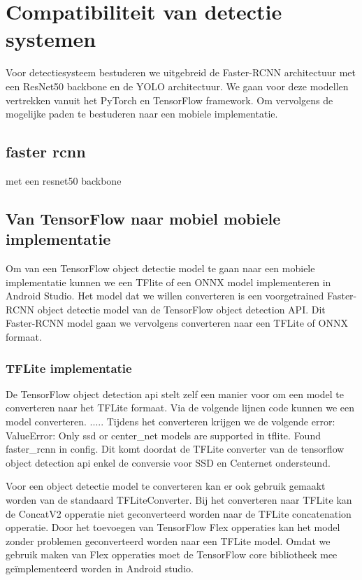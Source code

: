 \chapter{Compatibiliteit van detectie systemen}
Voor detectiesysteem bestuderen we uitgebreid de Faster-RCNN architectuur met een ResNet50 backbone en de YOLO architectuur.
We gaan voor deze modellen vertrekken vanuit het PyTorch en TensorFlow framework.
Om vervolgens de mogelijke paden te bestuderen naar een mobiele implementatie.

\section{faster rcnn}
met een resnet50 backbone

\section{Van TensorFlow naar mobiel mobiele implementatie}
Om van een TensorFlow object detectie model te gaan naar een mobiele implementatie kunnen we een TFlite of een ONNX model implementeren in Android Studio.
Het model dat we willen converteren is een voorgetrained Faster-RCNN object detectie model van de TensorFlow object detection API.
Dit Faster-RCNN model gaan we vervolgens converteren naar een TFLite of ONNX formaat.

\subsection{TFLite implementatie}

De TensorFlow object detection api stelt zelf een manier voor om een model te converteren naar het TFLite formaat.
Via de volgende lijnen code kunnen we een model converteren.
.....
Tijdens het converteren krijgen we de volgende error: ValueError: Only ssd or center\_net models are supported in tflite. Found faster\_rcnn in config.
Dit komt doordat de TFLite converter van de tensorflow object detection api enkel de conversie voor SSD en Centernet ondersteund.

Voor een object detectie model te converteren kan er ook gebruik gemaakt worden van de standaard TFLiteConverter.
Bij het converteren naar TFLite kan de ConcatV2 opperatie niet geconverteerd worden naar de TFLite concatenation opperatie.
Door het toevoegen van TensorFlow Flex opperaties kan het model zonder problemen geconverteerd worden naar een TFLite model.
Omdat we gebruik maken van Flex opperaties moet de TensorFlow core bibliotheek mee ge\"implementeerd worden in Android studio.

